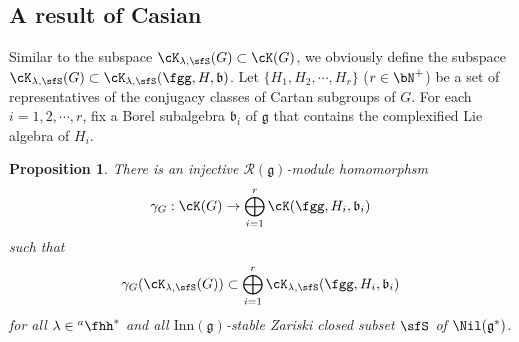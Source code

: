 \documentclass[12pt,a4paper]{amsart}
\newcommand{\g}{\mathfrak g}
\renewcommand{\b}{\mathfrak b}
\newcommand{\be}{\begin {equation}}
\newcommand{\ee}{\end {equation}}
\numberwithin{equation}{section}
\newtheorem{prop}[thm]{Proposition}
\theoremstyle{remark}
\def\hha{{}^a\fhh}
\def\Inn{\mathrm{Inn}}
\newcommand{\Grt}{\cK}
\begin{document}
\subsection{A result of Casian}

 Similar to the subspace $\Grt_{\lambda, \sfS}(G)\subset \Grt(G)$, we obviously define the subspace $\Grt_{\lambda, \sfS}(G)\subset \Grt_{\lambda, \sfS}(\fgg,H,\b)$.
Let $\{H_1, H_2, \cdots, H_r\}$ ($r\in \bN^+$) be  a set of representatives of the
  conjugacy classes of  Cartan subgroups of $G$. For each $i=1,2,\cdots, r$, fix a Borel subalgebra $\b_i$ of $\g$ that contains the complexified Lie algebra of $H_i$.

 \begin{prop}\label{cor:HC.embed}
 There is an injective $\mathcal R(\g)$-module homomorphsm
 \[
\gamma_G: \Grt(G)\rightarrow  \bigoplus_{i=1}^{r} \Grt(\fgg,H_{i},\b_{i})
 \]
 such that
 \be\label{gammag}
   \gamma_G(\Grt_{\lambda, \sfS}(G))\subset  \bigoplus_{i=1}^{r} \Grt_{\lambda, \sfS}(\fgg,H_{i},\b_{i})
 \ee
 for all $\lambda\in \hha^*$ and all $\Inn(\g)$-stable Zariski closed subset $\sfS$ of $\Nil(\g^*)$.

 \end{prop}
\end{document}
